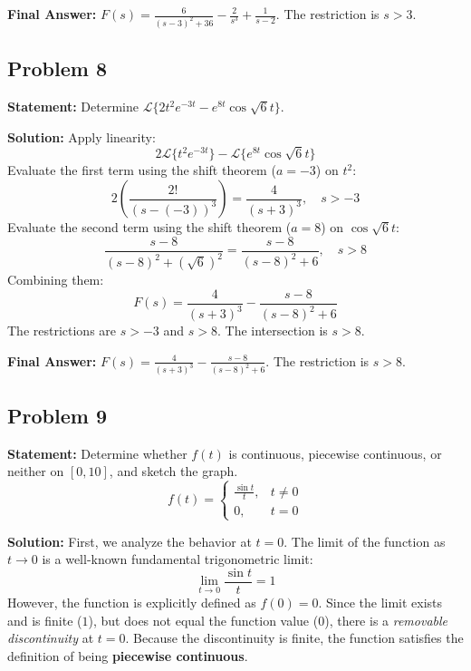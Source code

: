 \documentclass[11pt, a4paper]{article}
\theoremstyle{definition}
\theoremstyle{remark}
\begin{document}
\textbf{Final Answer:} $F(s) = \frac{6}{(s - 3)^2 + 36} - \frac{2}{s^3} + \frac{1}{s - 2}$. The restriction is $s > 3$.

\vspace{1em}
\subsection{Problem 8}
\textbf{Statement:} Determine $\mathscr{L}\{2t^2 e^{-3t} - e^{8t} \cos \sqrt{6}t\}$.

\textbf{Solution:}
Apply linearity:
\[
2\mathscr{L}\{t^2 e^{-3t}\} - \mathscr{L}\{e^{8t} \cos \sqrt{6}t\}
\]
Evaluate the first term using the shift theorem ($a = -3$) on $t^2$:
\[
2 \left( \frac{2!}{(s - (-3))^3} \right) = \frac{4}{(s + 3)^3}, \quad s > -3
\]
Evaluate the second term using the shift theorem ($a = 8$) on $\cos \sqrt{6}t$:
\[
\frac{s - 8}{(s - 8)^2 + (\sqrt{6})^2} = \frac{s - 8}{(s - 8)^2 + 6}, \quad s > 8
\]
Combining them:
\[
F(s) = \frac{4}{(s + 3)^3} - \frac{s - 8}{(s - 8)^2 + 6}
\]
The restrictions are $s > -3$ and $s > 8$. The intersection is $s > 8$.

\textbf{Final Answer:} $F(s) = \frac{4}{(s + 3)^3} - \frac{s - 8}{(s - 8)^2 + 6}$. The restriction is $s > 8$.

\vspace{1em}
\subsection{Problem 9}
\textbf{Statement:} Determine whether $f(t)$ is continuous, piecewise continuous, or neither on $[0,10]$, and sketch the graph.
\[
f(t) = 
\begin{cases} 
\frac{\sin t}{t}, & t \neq 0 \\ 
0, & t = 0 
\end{cases}
\]

\textbf{Solution:}
First, we analyze the behavior at $t = 0$. The limit of the function as $t \to 0$ is a well-known fundamental trigonometric limit:
\[
\lim_{t \to 0} \frac{\sin t}{t} = 1
\]
However, the function is explicitly defined as $f(0) = 0$. Since the limit exists and is finite ($1$), but does not equal the function value ($0$), there is a \textit{removable discontinuity} at $t = 0$. 
Because the discontinuity is finite, the function satisfies the definition of being \textbf{piecewise continuous}.
\end{document}
